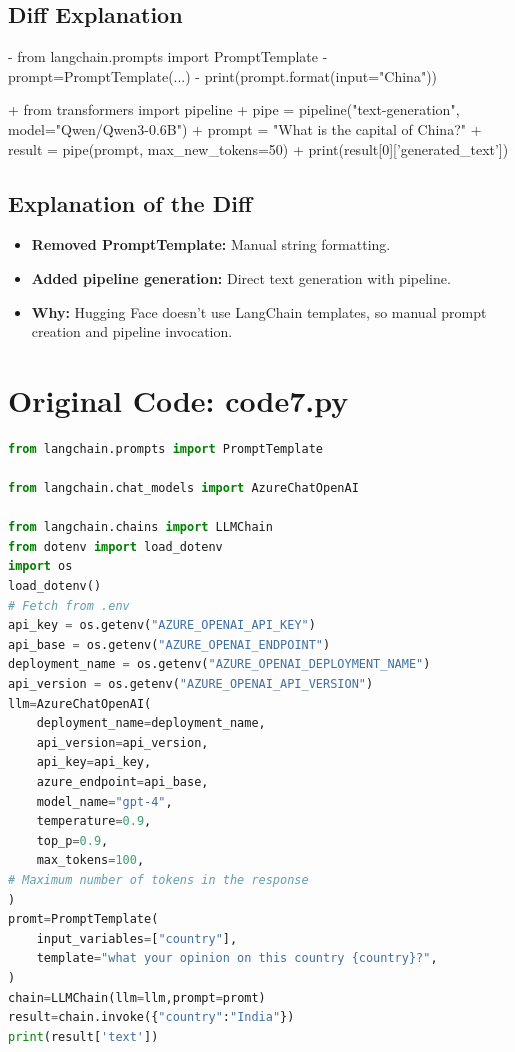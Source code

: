 \documentclass[11pt, a4paper]{article}
\begin{document}
\subsection{Diff Explanation}
\begin{removedcode}
\begin{diffverb}
- from langchain.prompts import PromptTemplate
- prompt=PromptTemplate(...)
- print(prompt.format(input="China"))
\end{diffverb}
\end{removedcode}

\begin{addedcode}
\begin{diffverb}
+ from transformers import pipeline
+ pipe = pipeline("text-generation", model="Qwen/Qwen3-0.6B")
+ prompt = "What is the capital of China?"
+ result = pipe(prompt, max_new_tokens=50)
+ print(result[0]['generated_text'])
\end{diffverb}
\end{addedcode}


\subsection{Explanation of the Diff}
\begin{itemize}
    \item \textbf{Removed PromptTemplate:} Manual string formatting.
    \item \textbf{Added pipeline generation:} Direct text generation with pipeline.
    \item \textbf{Why:} Hugging Face doesn't use LangChain templates, so manual prompt creation and pipeline invocation.
\end{itemize}


\newpage
\section{Original Code: code7.py}
\begin{lstlisting}[language=Python]
from langchain.prompts import PromptTemplate

from langchain.chat_models import AzureChatOpenAI

from langchain.chains import LLMChain
from dotenv import load_dotenv
import os
load_dotenv()
# Fetch from .env
api_key = os.getenv("AZURE_OPENAI_API_KEY")
api_base = os.getenv("AZURE_OPENAI_ENDPOINT")
deployment_name = os.getenv("AZURE_OPENAI_DEPLOYMENT_NAME")
api_version = os.getenv("AZURE_OPENAI_API_VERSION")
llm=AzureChatOpenAI(
    deployment_name=deployment_name,
    api_version=api_version,
    api_key=api_key,
    azure_endpoint=api_base,
    model_name="gpt-4",
    temperature=0.9,
    top_p=0.9,
    max_tokens=100,
# Maximum number of tokens in the response
)
promt=PromptTemplate(
    input_variables=["country"],
    template="what your opinion on this country {country}?",
)
chain=LLMChain(llm=llm,prompt=promt)
result=chain.invoke({"country":"India"})
print(result['text'])
\end{lstlisting}
\end{document}
